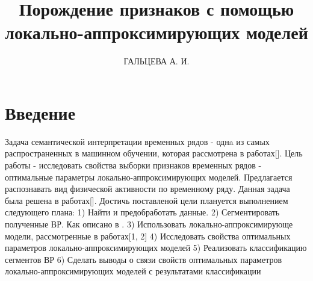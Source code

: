 \documentclass[12pt,twoside]{article}
\title
    [Порождение признаков с помощью локально-аппроксимирующих моделей]
    {Порождение признаков с помощью локально-аппроксимирующих моделей}
\author {ГАЛЬЦЕВА А. И.} %
\begin{document}
\maketitle



\section{Введение}
 Задача семантической интерпретации временных рядов - однa из самых распространенных в машинном обучении, которая рассмотрена в работах[]. Цель работы - исследовать свойства выборки признаков временных рядов - оптимальные параметры локально-аппроксимирующих моделей. Предлагается распознавать вид физической активности по временному ряду. Данная задача была решена в работах[].
 Достичь поставленой цели плануется выполнением следующего плана:
 1) Найти и предобработать данные.
 2) Сегментировать полученные ВР. Как описано в  \cite{motrenko}.
 3) Использовать локально-аппроксимирующе модели, рассмотренные в работах[1, 2]
 4) Исследовать свойства оптимальных параметров локально-аппроксимирующих моделей
 5) Реализовать классификацию сегментов ВР
 6) Сделать выводы о связи свойств оптимальных параметров локально-аппроксимирующих моделей  с результатами классификации 
 




\end{document}
